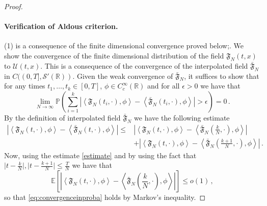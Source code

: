 \documentclass[a4paper,11pt,oneside,reqno]{amsart}
\theoremstyle{definition}
\newcommand{\R}{\ensuremath{\mathbb{R}}}
\renewcommand{\leq}{\leqslant}
\numberwithin{equation}{section}
\begin{document}
\begin{proof}
\paragraph{Verification of Aldous criterion. }
(1) is a consequence of the finite dimensional convergence proved below{\color{black};}. 
We show the convergence of the finite dimensional distribution of the field $\mathfrak{F}_{N}(t,x)$ to  $\mathcal{U}(t,x)$. This is a consequence of the convergence of the interpolated field $\bar{\mathfrak{F}}_{N}$ in $C((0,T], \mathcal S'(\R))$. 
Given the weak convergence of $\bar{\mathfrak{F}}_{N}$, it suffices to show that 
for any {\color{black}times $t_1, \dots, t_k\in [0,T]$},  $\phi\in C_{c}^{\infty}(\mathbb{R})$ and for all $\epsilon>0$ we have that {\color{black}
	\begin{equation}
		\lim_{N\to \infty}\mathbb{P}\left( \sum_{i=1}^k \left|\left\langle \mathfrak{F}_{N}\left(t_i,\cdot\right),\phi\right\rangle -\left\langle \bar{\mathfrak{F}}_{N}\left(t_i,\cdot\right),\phi\right\rangle \right|>\epsilon\right)=0\,.
		\label{eq:convergenceinproba}
\end{equation}}
By the definition of interpolated field $\bar{\mathfrak{F}}_{N}$ we have the following estimate
\begin{equation*}
	\begin{split}
		\left|\left\langle \mathfrak{F}_{N}\left(t,\cdot\right),\phi\right\rangle -\left\langle \bar{\mathfrak{F}}_{N}\left(t,\cdot\right),\phi\right\rangle \right|\leq& \left|\left\langle \mathfrak{F}_{N}\left(t,\cdot\right),\phi\right\rangle -\left\langle \bar{\mathfrak{F}}_{N}\left(\frac{k}{N},\cdot\right),\phi\right\rangle \right|
		\\&+
		\left|\left\langle \mathfrak{F}_{N}\left(t,\cdot\right),\phi\right\rangle -\left\langle \bar{\mathfrak{F}}_{N}\left(\frac{k+1}{N},\cdot\right),\phi\right\rangle \right|\,.
	\end{split}
\end{equation*}
Now, using the estimate \eqref{estimate} and by using the fact that $\vert t-\frac{k}{N}\vert, \vert t-\frac{k+1}{N} \vert\leq \frac{T}{N}$ we have that 
\begin{equation*}
	\mathbb{E}\left[ \left|\left\langle \mathfrak{F}_{N}\left(t,\cdot\right),\phi\right\rangle -\left\langle \bar{\mathfrak{F}}_{N}\left(\frac{k}{N},\cdot\right),\phi\right\rangle \right|\right]\leq o(1)\,, 
\end{equation*}
so that \eqref{eq:convergenceinproba} holds by Markov's inequality. 


\end{proof}
\end{document}
